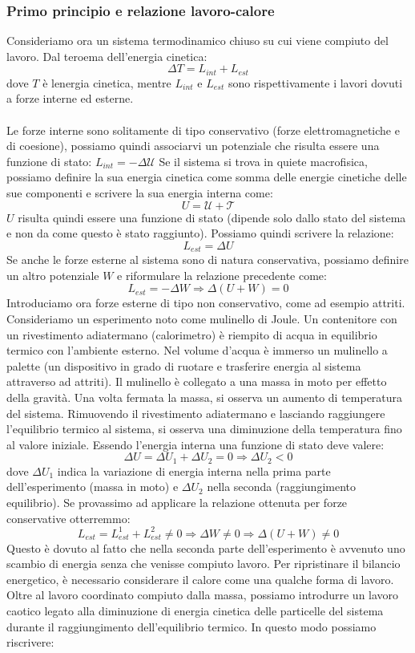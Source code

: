 \documentclass{article}
\begin{document}
\subsubsection{Primo principio e relazione lavoro-calore}
Consideriamo ora un sistema termodinamico chiuso su cui viene compiuto del lavoro. Dal teroema dell'energia cinetica:
$$ \Delta T = L_{int} + L_{est} $$
dove $T$ è lenergia cinetica, mentre $L_{int}$ e $L_{est}$ sono rispettivamente i lavori dovuti a forze interne ed esterne.\\\\
Le forze interne sono solitamente di tipo conservativo (forze elettromagnetiche e di coesione), possiamo quindi associarvi un potenziale che risulta essere una funzione di stato:
$L_{int}=-\Delta \mathcal{U} $
Se il sistema si trova in quiete macrofisica, possiamo definire la sua energia cinetica come somma delle energie cinetiche delle sue componenti e scrivere la sua energia interna come:
$$ U=\mathcal{U} +\mathcal{T}  $$
$U$ risulta quindi essere una funzione di stato (dipende solo dallo stato del sistema e non da come questo è stato raggiunto). Possiamo quindi scrivere la relazione:
$$ L_{est} = \Delta U $$
Se anche le forze esterne al sistema sono di natura conservativa, possiamo definire un altro potenziale $W$ e riformulare la relazione precedente come:
$$ L_{est}=-\Delta W\Rightarrow \Delta(U+W)=0 $$
Introduciamo ora forze esterne di tipo non conservativo, come ad esempio attriti. Consideriamo un esperimento noto come mulinello di Joule. Un contenitore con un rivestimento adiatermano (calorimetro) è riempito di acqua in equilibrio termico con l'ambiente esterno. Nel volume d'acqua è immerso un mulinello a palette (un dispositivo in grado di ruotare e trasferire energia al sistema attraverso ad attriti). Il mulinello è collegato a una massa in moto per effetto della gravità. Una volta fermata la massa, si osserva un aumento di temperatura del sistema. Rimuovendo il rivestimento adiatermano e lasciando raggiungere l'equilibrio termico al sistema, si osserva una diminuzione della temperatura fino al valore iniziale. Essendo l'energia interna una funzione di stato deve valere:
$$ \Delta U = \Delta U_1+\Delta U_2 = 0\Rightarrow\Delta U_2<0 $$
dove $\Delta U_1$ indica la variazione di energia interna nella prima parte dell'esperimento (massa in moto) e $\Delta U_2$ nella seconda (raggiungimento equilibrio). Se provassimo ad applicare la relazione ottenuta per forze conservative otterremmo:
$$ L_{est} = L_{est}^1+L_{est}^2\neq0\Rightarrow\Delta W\neq0\Rightarrow\Delta(U+W)\neq0 $$
Questo è dovuto al fatto che nella seconda parte dell'esperimento è avvenuto uno scambio di energia senza che venisse compiuto lavoro. Per ripristinare il bilancio energetico, è necessario considerare il calore come una qualche forma di lavoro. Oltre al lavoro coordinato compiuto dalla massa, possiamo introdurre un lavoro caotico legato alla diminuzione di energia cinetica delle particelle del sistema durante il raggiungimento dell'equilibrio termico. In questo modo possiamo riscrivere:
\end{document}
